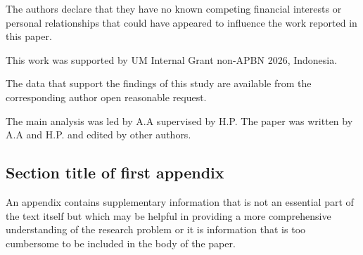 \documentclass[pdflatex,sn-mathphys-num]{sn-jnl}%
\theoremstyle{thmstyleone}%
\theoremstyle{thmstyletwo}%
\theoremstyle{thmstylethree}%
\begin{document}
\backmatter

The authors declare that they have no known competing financial interests or personal relationships that could have appeared to influence the work reported in this paper.

This work was supported by UM Internal Grant non-APBN 2026, Indonesia.

The data that support the findings of this study are available from the corresponding author open reasonable request.

The main analysis was led by A.A supervised by H.P. The paper was written by A.A and H.P. and edited by other authors.

\begin{appendices}

\section{Section title of first appendix}\label{secA1}

An appendix contains supplementary information that is not an essential part of the text itself but which may be helpful in providing a more comprehensive understanding of the research problem or it is information that is too cumbersome to be included in the body of the paper.


\end{appendices}

        
\end{document}
